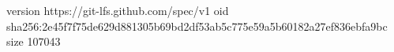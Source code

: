 version https://git-lfs.github.com/spec/v1
oid sha256:2e45f7f75de629d881305b69bd2df53ab5c775e59a5b60182a27ef836ebfa9bc
size 107043
